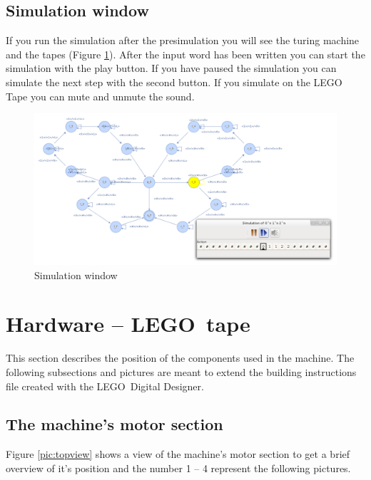 \documentclass[%
  a4paper,%
  11pt,%
  blue,%
  hyperref	%
  ]{tubsartcl}
\begin{document}
\subsection{Simulation window}
If you run the simulation after the presimulation you will see the turing machine and the tapes (Figure \ref{pic:simulation_window}). After the input word has been written you can start the simulation with the play button. If you have paused the simulation you can simulate the next step with the second button. If you simulate on the LEGO\textregistered\, Tape you can mute and unmute the sound.
\begin{figure}[!htb]
\begin{center}
\includegraphics[scale=0.35]{graphics_gui/simulation_window.png}
\end{center}
\caption{Simulation window}
\label{pic:simulation_window}
\end{figure}

\clearpage

\section{Hardware -- LEGO\textregistered\, tape}

This section describes the position of the components used in the machine. The following subsections and pictures are meant to extend the building instructions file created with the LEGO\textregistered\, Digital Designer.

\subsection{The machine's motor section}

Figure \ref{pic:topview} shows a view of the machine's motor section to get a brief overview of it's position and the number 1 -- 4 represent the following pictures.
\end{document}
